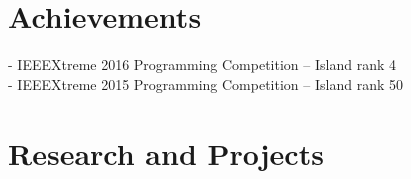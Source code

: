 \documentclass[letterpaper]{twentysecondcv} %
\begin{document}
\section{Achievements}

- IEEEXtreme 2016 Programming Competition – Island rank 4
\newline
\\- IEEEXtreme 2015 Programming Competition – Island rank 50


%
%
%


\section{Research and Projects}
\end{document}
